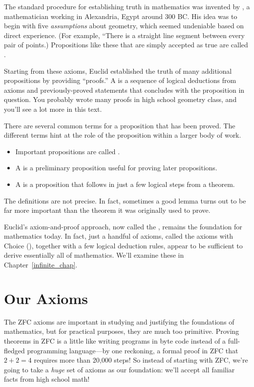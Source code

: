 The standard procedure for establishing truth in mathematics was invented
by , a mathematician working in Alexandria, Egypt around 300 BC.
His idea was to begin with five \textit{assumptions} about geometry, which
seemed undeniable based on direct experience.  (For example, ``There is a
straight line segment between every pair of points.)  Propositions like
these that are simply accepted as true are called .

Starting from these axioms, Euclid established the truth of many
additional propositions by providing ``proofs.''  A  is a
sequence of logical deductions from axioms and previously-proved
statements that concludes with the proposition in question.  You
probably wrote many proofs in high school geometry class, and you'll
see a lot more in this text.

There are several common terms for a proposition that has been proved.
The different terms hint at the role of the proposition within a
larger body of work.
%
\begin{itemize}
\item Important propositions are called .
\item A  is a preliminary proposition useful for proving
later propositions.
\item A  is a proposition that follows
in just a few logical steps from a theorem.  
\end{itemize}
%
The definitions are not precise.  In fact, sometimes a good lemma
turns out to be far more important than the theorem it was originally
used to prove.

Euclid's axiom-and-proof approach, now called the , remains the foundation for mathematics today.  In fact,
just a handful of axioms, called the axioms  with
Choice (), together with a few logical deduction rules,
appear to be sufficient to derive essentially all of mathematics.
We'll examine these in Chapter~\ref{infinite_chap}.

\section{Our Axioms}

The ZFC axioms are important in studying and justifying the foundations of
mathematics, but for practical purposes, they are much too primitive.
Proving theorems in ZFC is a little like writing programs in byte code
instead of a full-fledged programming language---by one reckoning, a
formal proof in ZFC that $2 + 2 = 4$ requires more than 20,000 steps!  So
instead of starting with ZFC, we're going to take a \textit{huge} set of
axioms as our foundation: we'll accept all familiar facts from high school
math!

